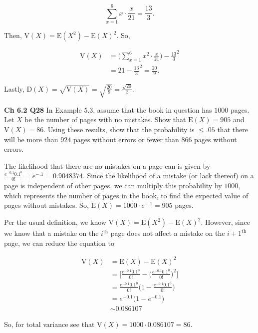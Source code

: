 \documentclass[12pt]{article}
\newcommand{\nspace}{\vspace*{.5cm}}
\newcommand{\nline}{\nspace \noindent}
\newcommand{\expected}[1]{\text{E}(#1)}
\begin{document}
\begin{equation*}
\sum_{x=1}^{6} x \cdot \frac{x}{21} = \frac{13}{3}.
\end{equation*}

\nline
Then, $\text{V}(X)  = \expected{X^2} - \expected{X}^2$. So, 

\begin{align*}
\text{V}(X) &= \Big ( \sum_{x=1}^{6} x^2 \cdot \frac{x}{21} \Big ) - \frac{13}{3}^2 \\
&= 21 - \frac{13}{3}^2 = \frac{20}{9}.
\end{align*}

\nline
Lastly, $\text{D}(X) = \sqrt{\text{V}(X)} = \sqrt{ \frac{20}{9}} = \frac{\sqrt{20}}{3}$.

\nline
\textbf{Ch 6.2 Q28} In Example $5.3$, assume that the book in question has $1000$ pages. Let $X$ be the number of pages with no mistakes. Show that $\expected{X} = 905$ and $\text{V}(X) = 86$. Using these results, show that the probability is $\leq .05$ that there will be more than $924$ pages without errors or fewer than $866$ pages without errors.

\nline
The likelihood that there are no mistakes on a page can is given by $\frac{ e^{- 0.1} 0.1^0 }{0!} = e^{-.1} = 0.9048374$. Since the likelihood of a mistake (or lack thereof) on a page is independent of other pages, we can multiply this probability by $1000$, which represents the number of pages in the book, to find the expected value of pages without mistakes. So, $\expected{X} = 1000 \cdot e^{-.1} = 905$ pages.

\nline
Per the usual definition, we know $\text{V}(X) = \expected{X^2} - \expected{X}^2$. However, since we know that a mistake on the $i^{\text{th}}$ page does not affect a mistake on the $i+1^{\text{th}}$ page, we can reduce the equation to 

\begin{align*}
\text{V}(X) &= \expected{X} - \expected{X}^2 \\
&= \Bigg [ \frac{ e^{- 0.1} 0.1^0 }{0!} - \Bigg ( \frac{ e^{- 0.1} 0.1^0 }{0!} \Bigg )^2 \Bigg ] \\
&= \frac{ e^{- 0.1} 0.1^0 }{0!} \Bigg ( 1- \frac{ e^{- 0.1} 0.1^0 }{0!} \Bigg ) \\
&= e^{- 0.1} \Bigg ( 1- e^{- 0.1} \Bigg ) \\
& \sim 0.086107 
\end{align*}

\nline
So, for total variance see that $\text{V}(X) = 1000 \cdot 0.086107 = 86$.
\end{document}
